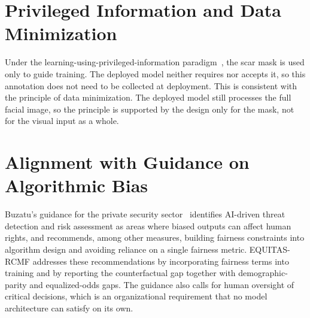 \section{Privileged Information and Data Minimization}
Under the learning-using-privileged-information paradigm~\cite{vapnik2009, vapnik2015}, the scar mask is used only to guide training. The deployed model neither requires nor accepts it, so this annotation does not need to be collected at deployment. This is consistent with the principle of data minimization. The deployed model still processes the full facial image, so the principle is supported by the design only for the mask, not for the visual input as a whole.

\section{Alignment with Guidance on Algorithmic Bias}
Buzatu's guidance for the private security sector~\cite{buzatu2024} identifies AI-driven threat detection and risk assessment as areas where biased outputs can affect human rights, and recommends, among other measures, building fairness constraints into algorithm design and avoiding reliance on a single fairness metric. EQUITAS-RCMF addresses these recommendations by incorporating fairness terms into training and by reporting the counterfactual gap together with demographic-parity and equalized-odds gaps. The guidance also calls for human oversight of critical decisions, which is an organizational requirement that no model architecture can satisfy on its own.

